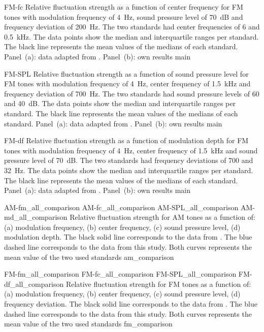 \documentclass[../../main.tex]{subfiles}
\begin{document}
\begin{experimentalresults}
\myfigurefastlexpstds%
  {FM-fc}
  {Relative fluctuation strength as a function of center frequency for
    \gls{FM} tones with modulation frequency of 4~Hz, sound pressure level of
    70~dB and frequency deviation of 200~Hz.  The two standards had center
    frequencies of 6 and 0.5~kHz. The data points show the median and
    interquartile ranges per standard. The black line represents the mean values
    of the medians of each standard. Panel~(a): data adapted from
    \cite[pp.250]{Fastl2007Psychoacoustics}. Panel~(b): own results}
  {main}

\myfigurefastlexpstds%
  {FM-SPL}
  {Relative fluctuation strength as a function of sound pressure level for
    \gls{FM} tones with modulation frequency of 4~Hz, center frequency of
    1.5~kHz and frequency deviation of 700~Hz.  The two standards had sound
    pressure levels of 60 and 40~dB. The data points show the median and
    interquartile ranges per standard. The black line represents the mean values
    of the medians of each standard. Panel~(a): data adapted from
    \cite[pp.249]{Fastl2007Psychoacoustics}. Panel~(b): own results}
  {main}

\myfigurefastlexpstds%
  {FM-df}
  {Relative fluctuation strength as a function of modulation depth for
    \gls{FM} tones with modulation frequency of 4~Hz, center frequency of
    1.5~kHz and sound pressure level of 70~dB.  The two standards had frequency
    deviations of 700 and 32~Hz. The data points show the median and
    interquartile ranges per standard. The black line represents the mean values
    of the medians of each standard. Panel~(a): data adapted from
    \cite[pp.251]{Fastl2007Psychoacoustics}. Panel~(b): own results}
  {main}

\myfigurequadlabeled%
  {AM-fm_all_comparison}
  {AM-fc_all_comparison}
  {AM-SPL_all_comparison}
  {AM-md_all_comparison}
  {Relative fluctuation strength for AM tones as a function of: (a) modulation
    frequency, (b) center frequency, (c) sound pressure level, (d) modulation
    depth. The black solid line corresponds to the data from
    \textcite{Fastl2007Psychoacoustics}. The blue dashed line corresponds to the
    data from this study. Both curves represents the mean value of the two used
    standards}
  {am_comparison}

\myfigurequadlabeled%
  {FM-fm_all_comparison}
  {FM-fc_all_comparison}
  {FM-SPL_all_comparison}
  {FM-df_all_comparison}
  {Relative fluctuation strength for FM tones as a function of: (a) modulation
    frequency, (b) center frequency, (c) sound pressure level, (d) frequency
    deviation. The black solid line corresponds to the data from
    \textcite{Fastl2007Psychoacoustics}. The blue dashed line corresponds to the
    data from this study. Both curves represents the mean value of the two used
    standards}
  {fm_comparison}

\end{experimentalresults}
\end{document}
